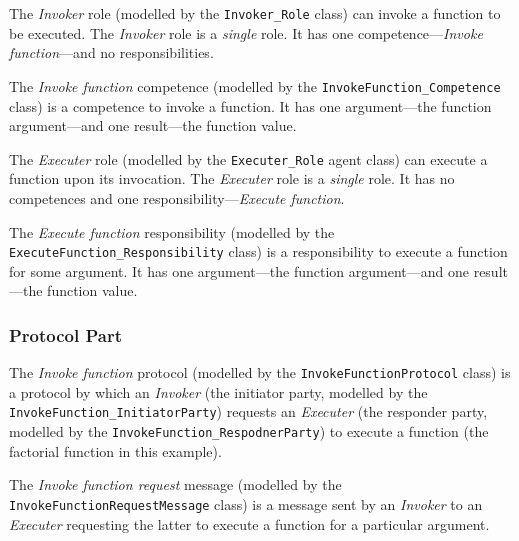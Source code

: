 The \textit{Invoker} role (modelled by the \texttt{Invoker\_Role} class) can invoke a function to be executed.
The \textit{Invoker} role is a \textit{single} role.
It has one competence---\textit{Invoke function}---and no responsibilities.

The \textit{Invoke function} competence (modelled by the \texttt{InvokeFunction\_Competence} class) is a competence to invoke a function.
It has one argument---the function argument---and one result---the function value.

The \textit{Executer} role (modelled by the \texttt{Executer\_Role} agent class) can execute a function upon its invocation.
The \textit{Executer} role is a \textit{single} role.
It has no competences and one responsibility---\textit{Execute function}.

The \textit{Execute function} responsibility (modelled by the \texttt{ExecuteFunction\_Responsibility} class) is a responsibility to execute a function for some argument.
It has one argument---the function argument---and one result---the function value.

\subsubsection*{Protocol Part}

The \textit{Invoke function} protocol (modelled by the \texttt{InvokeFunctionProtocol} class) is a protocol by which an \textit{Invoker} (the initiator party, modelled by the \texttt{InvokeFunction\_InitiatorParty}) requests an \textit{Executer} (the responder party, modelled by the \texttt{InvokeFunction\_RespodnerParty}) to execute a function (the factorial function in this example).

The \textit{Invoke function request} message (modelled by the \texttt{InvokeFunctionRequestMessage} class) is a message sent by an \textit{Invoker} to an \textit{Executer} requesting the latter to execute a function for a particular argument.

